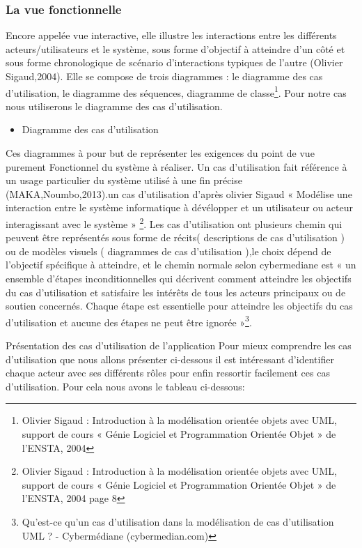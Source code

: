 \documentclass[a4paper, 12pt]{article}
\begin{document}
\subsubsection{La vue fonctionnelle}
\quad Encore appelée vue interactive, elle illustre les interactions entre les différents acteurs/utilisateurs et le système, sous forme d’objectif à atteindre d’un côté et sous forme chronologique de scénario d’interactions typiques de l’autre (Olivier Sigaud,2004). Elle se compose de trois diagrammes : le diagramme des cas d’utilisation, le diagramme des séquences, diagramme de classe\footnote{Olivier Sigaud : Introduction à la modélisation orientée objets avec UML, support de cours « Génie Logiciel et Programmation Orientée Objet » de l’ENSTA, 2004}. Pour notre cas nous utiliserons le diagramme des cas d’utilisation.
\newline
\begin{itemize}
\item Diagramme des cas d’utilisation
\end{itemize}
Ces diagrammes à pour but de représenter les exigences du point de vue purement Fonctionnel du système à réaliser. Un cas d’utilisation fait référence à un usage particulier du système utilisé à une fin précise (MAKA,Noumbo,2013).un cas d’utilisation d'après olivier Sigaud « Modélise une interaction entre le système informatique à dévélopper et un utilisateur ou acteur interagissant avec le système » \footnote{Olivier Sigaud : Introduction à la modélisation orientée objets avec UML, support de cours « Génie Logiciel et Programmation Orientée Objet » de l’ENSTA, 2004 page 8}.  Les cas d’utilisation ont plusieurs chemin qui peuvent être représentés sous forme de récits( descriptions de cas d’utilisation ) ou de modèles visuels ( diagrammes de cas d’utilisation ),le choix dépend de l'objectif spécifique à atteindre, et le chemin normale selon cybermediane est « un ensemble d’étapes inconditionnelles qui décrivent comment atteindre les objectifs du cas d’utilisation et satisfaire les intérêts de tous les acteurs principaux ou de soutien concernés. Chaque étape est essentielle pour atteindre les objectifs du cas d’utilisation et aucune des étapes ne peut être ignorée »\footnote{Qu'est-ce qu'un cas d'utilisation dans la modélisation de cas d'utilisation UML ? - Cybermédiane (cybermedian.com)}.

Présentation des cas d’utilisation de l’application
Pour mieux comprendre les cas d’utilisation que nous allons présenter ci-dessous il est intéressant d’identifier chaque acteur avec ses différents rôles pour enfin ressortir facilement ces cas d’utilisation. Pour cela nous avons le tableau ci-dessous:
\end{document}
